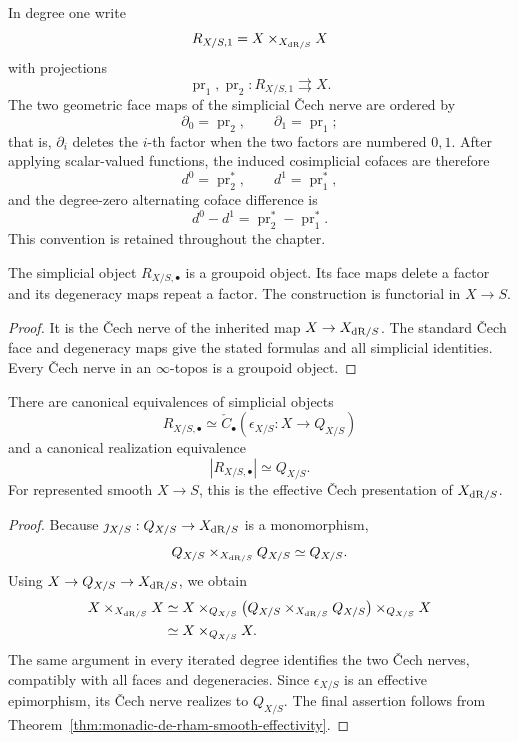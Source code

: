 \begin{convention}
\label{conv:monadic-de-rham-cech-face-order}
In degree one write
\[
    R_{X/S,1}
    =
    X\times_{X_{\mathrm{dR}/S}}X
\]
with projections
\[
    \operatorname{pr}_1,\operatorname{pr}_2:R_{X/S,1}\rightrightarrows X.
\]
The two geometric face maps of the simplicial \v{C}ech nerve are ordered by
\[
    \partial_0=\operatorname{pr}_2,
    \qquad
    \partial_1=\operatorname{pr}_1;
\]
that is, \(\partial_i\) deletes the \(i\)-th factor when the two factors are
numbered \(0,1\).  After applying scalar-valued functions, the induced
cosimplicial cofaces are therefore
\[
    d^0=\operatorname{pr}_2^*,
    \qquad
    d^1=\operatorname{pr}_1^*,
\]
and the degree-zero alternating coface difference is
\[
\boxed{
    d^0-d^1
    =
    \operatorname{pr}_2^*-\operatorname{pr}_1^*.
}
\]
This convention is retained throughout the chapter.
\end{convention}

\begin{proposition}
\label{prop:modal-simplex-structure}
The simplicial object \(R_{X/S,\bullet}\) is a groupoid object.  Its face maps delete a factor and
its degeneracy maps repeat a factor.  The construction is functorial in \(X\to S\).
\end{proposition}

\begin{proof}
It is the \v{C}ech nerve of the inherited map \(X\to X_{\mathrm{dR}/S}\).  The standard \v{C}ech face and
degeneracy maps give the stated formulas and all simplicial identities.  Every \v{C}ech nerve in an
\(\infty\)-topos is a groupoid object.
\end{proof}

\begin{theorem}
\label{thm:effective-infinitesimal-presentation}
There are canonical equivalences of simplicial objects
\[
\boxed{
    R_{X/S,\bullet}
    \simeq
    \check C_\bullet(\epsilon_{X/S}:X\to Q_{X/S})
}
\]
and a canonical realization equivalence
\[
\boxed{
    |R_{X/S,\bullet}|\simeq Q_{X/S}.
}
\]
For represented smooth \(X\to S\), this is the effective \v{C}ech presentation of
\(X_{\mathrm{dR}/S}\).
\end{theorem}

\begin{proof}
Because \(\jmath_{X/S}:Q_{X/S}\to X_{\mathrm{dR}/S}\) is a monomorphism,
\[
    Q_{X/S}\times_{X_{\mathrm{dR}/S}}Q_{X/S}\simeq Q_{X/S}.
\]
Using \(X\to Q_{X/S}\to X_{\mathrm{dR}/S}\), we obtain
\[
\begin{aligned}
    X\times_{X_{\mathrm{dR}/S}}X
    &\simeq
    X\times_{Q_{X/S}}
    \bigl(Q_{X/S}\times_{X_{\mathrm{dR}/S}}Q_{X/S}\bigr)
    \times_{Q_{X/S}}X
    \\
    &\simeq
    X\times_{Q_{X/S}}X.
\end{aligned}
\]
The same argument in every iterated degree identifies the two \v{C}ech nerves, compatibly with all
faces and degeneracies.  Since \(\epsilon_{X/S}\) is an effective epimorphism, its \v{C}ech nerve
realizes to \(Q_{X/S}\).  The final assertion follows from
Theorem~\ref{thm:monadic-de-rham-smooth-effectivity}.
\end{proof}

